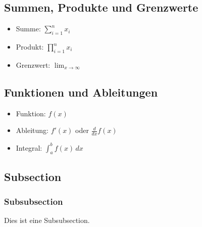 \documentclass[a4paper,10pt]{article}
\begin{document}
\subsection{Summen, Produkte und Grenzwerte}
\begin{itemize}
    \item Summe: $\sum_{i=1}^{n} x_i$
    \item Produkt: $\prod_{i=1}^{n} x_i$
    \item Grenzwert: $\lim_{x \to \infty}$
\end{itemize}

\subsection{Funktionen und Ableitungen}
\begin{itemize}
    \item Funktion: $f(x)$
    \item Ableitung: $f'(x)$ oder $\frac{d}{dx} f(x)$
    \item Integral: $\int_{a}^{b} f(x) \,dx$
\end{itemize}




\subsection{Subsection}
\subsubsection{Subsubsection}
Dies ist eine Subsubsection.


\vfill
{}
\end{document}
